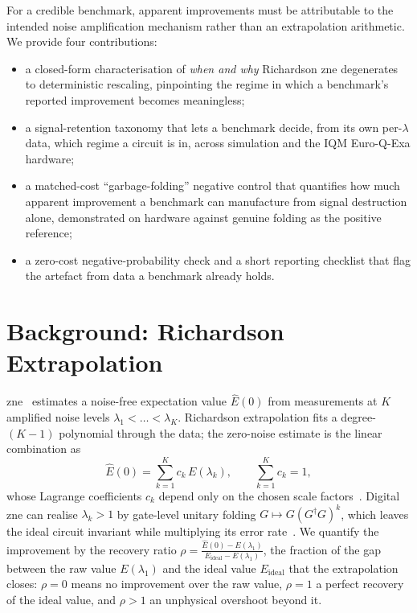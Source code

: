 \documentclass[10pt,conference, letterpaper]{IEEEtran}
\begin{document}
For a credible benchmark, apparent improvements must be attributable to the intended noise amplification mechanism rather than an extrapolation arithmetic. We provide four contributions:
\begin{itemize}
  \item a closed-form characterisation of \emph{when and why} Richardson \gls{zne} degenerates to deterministic rescaling, pinpointing the regime in which a benchmark's reported improvement becomes meaningless;
  \item a signal-retention taxonomy that lets a benchmark decide, from its own per-$\lambda$ data, which regime a circuit is in, across simulation and the IQM Euro-Q-Exa hardware;
  \item a matched-cost \enquote{garbage-folding} negative control that quantifies how much apparent improvement a benchmark can manufacture from signal destruction alone, demonstrated on hardware against genuine folding as the positive reference;
  \item a zero-cost negative-probability check and a short reporting checklist that flag the artefact from data a benchmark already holds.
\end{itemize}

\section{Background: Richardson Extrapolation}
\label{sec:background}
\gls{zne}~\cite{li_efficient_2017,temme_error_2017} estimates a noise-free expectation value $\hat{E}(0)$ from measurements at $K$ amplified noise levels $\lambda_1<\dots<\lambda_K$. Richardson extrapolation fits a degree-$(K{-}1)$ polynomial through the data; the zero-noise estimate is the linear combination as 
\begin{equation}
  \hat{E}(0)=\sum_{k=1}^{K}c_k\,E(\lambda_k),\qquad \sum_{k=1}^{K}c_k=1,
  \label{eq:richardson}
\end{equation}
whose Lagrange coefficients $c_k$ depend only on the chosen scale factors~\cite{cai_quantum_2023}. Digital \gls{zne} can realise $\lambda_k>1$ by gate-level unitary folding $G\mapsto G(G^\dagger G)^k$, which leaves the ideal circuit invariant while multiplying its error rate~\cite{giurgica-tiron_digital_2020}. We quantify the improvement by the recovery ratio $\rho = \frac{\hat{E}(0)-E(\lambda_1)}{E_\text{ideal}-E(\lambda_1)}$, the fraction of the gap between the raw value $E(\lambda_1)$ and the ideal value $E_\text{ideal}$ that the extrapolation closes: $\rho=0$ means no improvement over the raw value, $\rho=1$ a perfect recovery of the ideal value, and $\rho>1$ an unphysical overshoot beyond it.
\end{document}
